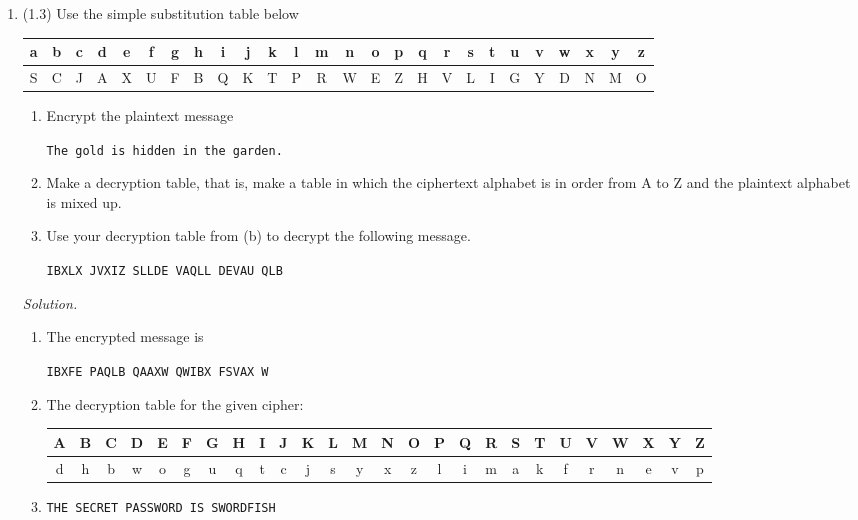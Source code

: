 \documentclass[12pt]{amsart}
\theoremstyle{definition}
\begin{document}
\begin{enumerate}
  \item (1.3) Use the simple substitution table below
  \begin{center}
	  \begin{tabular}{|c |c |c |c |c |c |c |c |c |c |c |c |c |c |c |c |c |c |c |c |c |c |c |c| c| c|}
		  \hline
		  a & b & c & d & e & f & g & h & i & j & k & l & m & n & o & 
		  p & q & r & s & t & u & v & w & x & y & z \\
		  \hline
		  S & C & J & A & X & U & F & B & Q & K & T & P & R & W & E & 
		  Z & H & V & L & I & G & Y & D & N & M & O \\
		  \hline
	  \end{tabular}
  \end{center}
  \begin{enumerate}
	  \item Encrypt the plaintext message
	  \begin{center}
		  \texttt{The gold is hidden in the garden.}
	  \end{center}
	  \item Make a decryption table, that is, make a table in which the ciphertext 
		  alphabet is in order from A to Z and the plaintext alphabet is mixed up.
	  \item Use your decryption table from (b) to decrypt the following message.
	  \begin{center}
		  \texttt{IBXLX JVXIZ SLLDE VAQLL DEVAU QLB}
	  \end{center}
  \end{enumerate}
  
  \medskip
  \textit{Solution.}

 	 \begin{enumerate}
		\item The encrypted message is
		\begin{center}
			\texttt{IBXFE PAQLB QAAXW QWIBX FSVAX W}
		\end{center}
	 	\item The decryption table for the given cipher:
            \begin{center}
                \hspace*{-1cm}
    			\begin{tabular}{|c |c |c |c |c |c |c |c |c |c |c |c |c |c |c |c |c |c |c |c |c |c |c |c| c| c|}
    				\hline
    				A & B & C & D & E & F & G & H & I & J & K & L & M & N & O & 
    				P & Q & R & S & T & U & V & W & X & Y & Z \\
    				\hline
    				d & h & b & w & o & g & u & q & t & c & j & s & y & x & z & 
    				l & i & m & a & k & f & r & n & e & v & p \\
    				\hline 
    			\end{tabular} 
	        \end{center} 
            \medskip
            \item \texttt{THE SECRET PASSWORD IS SWORDFISH} 
	 	\end{enumerate}


\end{enumerate}
\end{document}

